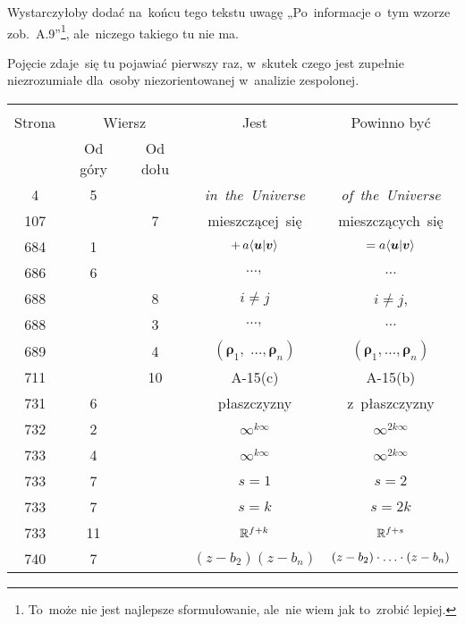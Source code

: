 \documentclass[a4paper,11pt]{article}
\begin{document}
Wystarczyłoby dodać na~końcu tego tekstu uwagę „Po~informacje o~tym
wzorze zob.~A.9”\footnote{To~może nie jest najlepsze sformułowanie,
  ale~nie wiem jak to~zrobić lepiej.}, ale~niczego takiego tu nie ma.

\vspace{\spaceFour}


\start {} Pojęcie  zdaje~się tu
pojawiać pierwszy raz, w~skutek czego jest zupełnie niezrozumiałe
dla~osoby niezorientowanej w~analizie zespolonej.






\begin{center}

  \begin{tabular}{|c|c|c|c|c|}
    \hline
    & \multicolumn{2}{c|}{} & & \\
    Strona & \multicolumn{2}{c|}{Wiersz} & Jest
                              & Powinno być \\ \cline{2-3}
    & Od góry & Od dołu & & \\
    \hline
    4   &  5 & & \textit{in~the~Universe} & \textit{of~the~Universe} \\
    107 & &  7 & mieszczącej~się & mieszczących~się \\
    684 &  1 & & $+\, a \langle  \boldsymbol{u}  |  \boldsymbol{v}  \rangle$
           & $= a \langle  \boldsymbol{u}  |  \boldsymbol{ v }  \rangle$ \\
    686 &  6 & & $\ldots,$ & $\ldots$ \\
    688 & &  8 & $i \neq j$ & $i \neq j$, \\
    688 & &  3 & $\ldots,$ & $\ldots$ \\
    689 & &  4 & $( \boldsymbol{\rho}_{ 1 },\; \ldots, \boldsymbol{\rho}_{ n } )$
           & $( \boldsymbol{\rho}_{ 1 }, \ldots, \boldsymbol{\rho}_{ n } )$ \\
    711 & & 10 & A-15(c) & A-15(b) \\
    731 &  6 & & płaszczyzny & z~płaszczyzny \\
    732 &  2 & & $\infty^{ k \infty }$ & $\infty^{ 2 k \infty }$ \\
    733 &  4 & & $\infty^{ k \infty }$ & $\infty^{ 2 k \infty }$ \\
    733 &  7 & & $s = 1$ & $s = 2$ \\
    733 &  7 & & $s = k$ & $s = 2k$ \\
    733 & 11 & & $\mathbb{R}^{ f + k }$ & $\mathbb{R}^{ f + s }$ \\
    740 &  7 & & $( z - b_{ 2 } )( z - b_{ n } )$
           & $( z - b_{ 2 } ) \cdot \ldots \cdot ( z - b_{ n } )$ \\
    \hline
  \end{tabular}

\end{center}
\end{document}
